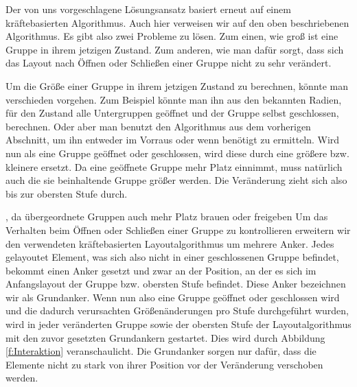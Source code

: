 Der von uns vorgeschlagene Lösungsansatz basiert erneut auf einem kräftebasierten Algorithmus. 
Auch hier verweisen wir auf den oben beschriebenen Algorithmus. Es gibt also zwei Probleme zu lösen. 
Zum einen, wie groß ist eine Gruppe in ihrem jetzigen Zustand.  
Zum anderen, wie man dafür sorgt, dass sich das Layout nach Öffnen oder Schließen einer Gruppe nicht zu sehr verändert.

Um die Größe einer Gruppe in ihrem jetzigen Zustand zu berechnen, könnte man verschieden vorgehen. 
Zum Beispiel könnte man ihn aus den bekannten Radien, für den Zustand alle Untergruppen geöffnet und der Gruppe selbst geschlossen, berechnen. 
Oder aber man benutzt den Algorithmus aus dem vorherigen Abschnitt, um ihn entweder im Vorraus oder wenn benötigt zu ermitteln. 
Wird nun als eine Gruppe geöffnet oder geschlossen, wird diese durch eine größere bzw. kleinere ersetzt. 
Da eine geöffnete Gruppe mehr Platz einnimmt, muss natürlich auch die sie beinhaltende Gruppe größer werden. 
Die Veränderung zieht sich also bis zur obersten Stufe durch.

, da übergeordnete Gruppen auch mehr Platz brauen oder freigeben
Um das Verhalten beim Öffnen oder Schließen einer Gruppe zu kontrollieren erweitern wir den verwendeten kräftebasierten Layoutalgorithmus um mehrere Anker. 
Jedes gelayoutet Element, was sich also nicht in einer geschlossenen Gruppe befindet, bekommt einen Anker gesetzt und zwar an der Position, 
an der es sich im Anfangslayout der Gruppe bzw. obersten Stufe befindet. 
Diese Anker bezeichnen wir als Grundanker. 
Wenn nun also eine Gruppe geöffnet oder geschlossen wird und die dadurch verursachten Größenänderungen pro Stufe durchgeführt wurden, 
wird in jeder veränderten Gruppe sowie der obersten Stufe der Layoutalgorithmus mit den zuvor gesetzten Grundankern gestartet. 
Dies wird  durch Abbildung \ref{f:Interaktion} veranschaulicht. Die Grundanker sorgen nur dafür, dass die Elemente nicht zu stark von ihrer Position vor der Veränderung verschoben werden.

